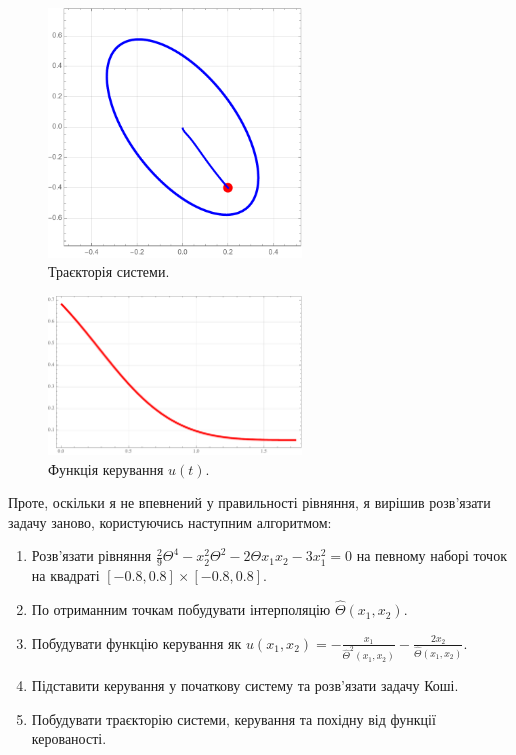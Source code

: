 \documentclass{hw_template}
\begin{document}
\begin{figure}[H]
    \centering
    \includegraphics[width=0.6\textwidth]{figures/trajectory_2.pdf}
    \caption{Траєкторія системи.}
    \label{fig:trajectory2}
\end{figure}

\begin{figure}[H]
    \centering
    \includegraphics[width=0.6\textwidth]{figures/control.pdf}
    \caption{Функція керування $u(t)$.}
    \label{fig:control}
\end{figure}

Проте, оскільки я не впевнений у правильності рівняння, я вирішив розв'язати задачу
заново, користуючись наступним алгоритмом:
\begin{enumerate}
    \item Розв'язати рівняння $\frac{2}{9}\Theta^4 - x_2^2\Theta^2-2\Theta x_1x_2-3x_1^2=0$ на певному наборі точок
    на квадраті $[-0.8,0.8] \times [-0.8,0.8]$.
    \item По отриманним точкам побудувати інтерполяцію $\hat{\Theta}(x_1,x_2)$.
    \item Побудувати функцію керування як $u(x_1,x_2)=-\frac{x_1}{\hat{\Theta}^2(x_1,x_2)}-\frac{2x_2}{\hat{\Theta}(x_1,x_2)}$.
    \item Підставити керування у початкову систему та розв'язати задачу Коші.
    \item Побудувати траєкторію системи, керування та похідну від функції керованості.
\end{enumerate}
\end{document}
